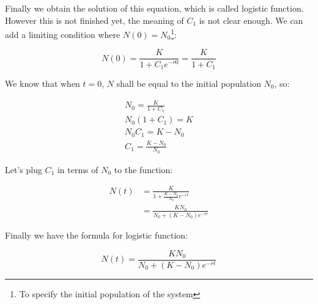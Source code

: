 Finally we obtain the solution of this equation, which is called logistic
function. However this is not finished yet, the meaning of $C_1$ is not clear
enough. We can add a limiting condition where $N(0)=N_0$\footnote{To specify
the initial population of the system}:

$$
N(0)=\frac{K}{1+C_1e^{-r0}}=\frac{K}{1+C_1}
$$

We know that when $t=0$, $N$ shall be equal to the initial population $N_0$, so:

$$
\begin{aligned}
	N_0=\frac{K}{1+C_1} \\
	N_0(1+C_1)=K \\
	N_0C_1=K-N_0 \\
	C_1=\frac{K-N_0}{N_0}
\end{aligned}
$$

Let's plug $C_1$ in terms of $N_0$ to the function:

$$
\begin{aligned}
	N(t)
	&=\frac{K}{1+\frac{K-N_0}{N_0}e^{-rt}} \\
	&=\frac{KN_0}{N_0+(K-N_0)e^{-rt}}
\end{aligned}
$$

Finally we have the formula for logistic function:

$$
N(t)=\frac{KN_0}{N_0+(K-N_0)e^{-rt}}
$$
